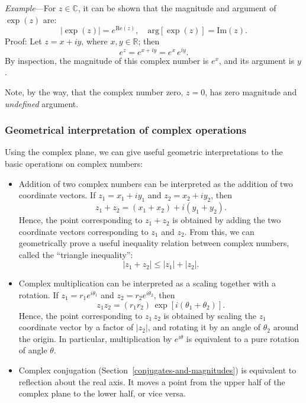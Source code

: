 \documentclass[10pt,a4paper]{article}
\begin{document}
\begin{framed} \noindent
\textit{Example}---For $z \in \mathbb{C}$, it can be shown that the
magnitude and argument of $\exp(z)$ are:
\begin{equation}
  \displaystyle\left|\exp(z)\right| = e^{\mathrm{Re}(z)}, \quad \mathrm{arg}\left[\exp(z)\right] = \mathrm{Im}(z).
\end{equation}
Proof: Let $z = x + i y$, where $x, y \in \mathbb{R}$; then
\begin{equation}
  e^{z} = e^{x + i y} = e^x \, e^{iy}.
\end{equation}
By inspection, the magnitude of this complex number is $e^x$, and its
argument is $y$.
\end{framed}

Note, by the way, that the complex number zero, $z = 0$, has zero
magnitude and \emph{undefined} argument.

\subsubsection{Geometrical interpretation of complex operations}
\label{geometrical-interpretation-of-complex-operations}

Using the complex plane, we can give useful geometric interpretations to
the basic operations on complex numbers:

\begin{itemize}
\item 
Addition of two complex numbers can be interpreted as the addition of
two coordinate vectors. If $z_1 = x_1 + i y_1$ and $z_2 = x_2 + i
y_2$, then
\begin{equation}
  z_1 + z_2 = \left(x_1 + x_2\right) + i\left(y_1 + y_2\right).
\end{equation}
Hence, the point corresponding to $z_1 + z_2$ is obtained by adding
the two coordinate vectors corresponding to $z_1$ and $z_2$. From
this, we can geometrically prove a useful inequality relation between
complex numbers, called the ``triangle inequality'':
\begin{equation}
  |z_1 + z_2| \le |z_1| + |z_2|.
\end{equation}

\item
Complex multiplication can be interpreted as a scaling together with a
rotation. If $z_1 = r_1e^{i\theta_1}$ and $z_2 = r_2e^{i\theta_2}$,
then
\begin{equation}
  z_1 z_2 = \left(r_1 r_2\right) \,\exp[i(\theta_1 + \theta_2)].
\end{equation}
Hence, the point corresponding to $z_1 \, z_2$ is obtained by scaling
the $z_1$ coordinate vector by a factor of $|z_2|$, and rotating it by
an angle of $\theta_2$ around the origin. In particular,
multiplication by $e^{i\theta}$ is equivalent to a pure rotation of
angle $\theta$.

\item
  Complex conjugation (Section~\ref{conjugates-and-magnitudes}) is
  equivalent to reflection about the real axis.  It moves a point from
  the upper half of the complex plane to the lower half, or vice
  versa.
\end{itemize}
\end{document}
